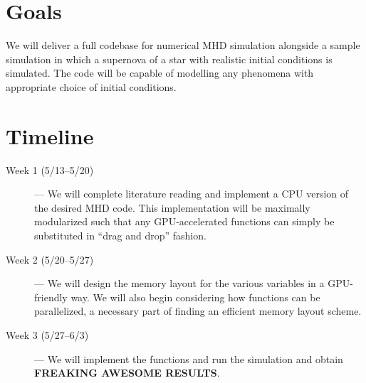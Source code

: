 \documentclass[10pt,twocolumn]{article}
\begin{document}
\section{Goals}

We will deliver a full codebase for numerical MHD simulation alongside a sample
simulation in which a supernova of a star with realistic initial conditions is
simulated. The code will be capable of modelling any phenomena with appropriate
choice of initial conditions.

\section{Timeline}

\begin{description}
    \item[Week 1 (5/13--5/20)] --- We will complete literature reading and
        implement a CPU version of the desired MHD code. This implementation
        will be maximally modularized such that any GPU-accelerated functions
        can simply be substituted in ``drag and drop'' fashion.

    \item[Week 2 (5/20--5/27)] --- We will design the memory layout for the
        various variables in a GPU-friendly way. We will also begin considering
        how functions can be parallelized, a necessary part of finding an
        efficient memory layout scheme.

    \item[Week 3 (5/27--6/3)] --- We will implement the functions and run the
        simulation and obtain \textbf{FREAKING AWESOME RESULTS}.
\end{description}
\end{document}
